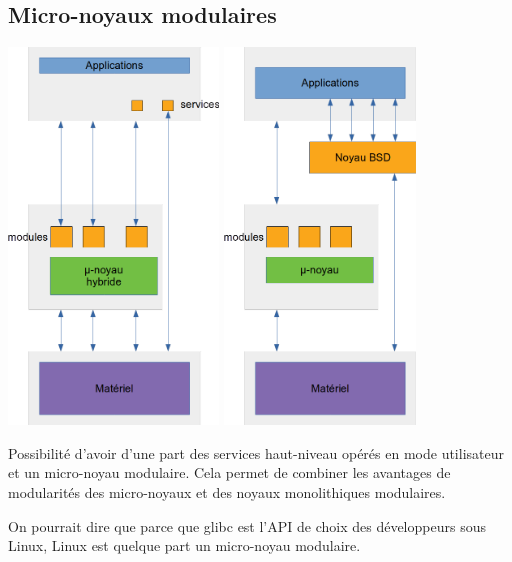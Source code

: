 \documentclass[10pt]{article}
\begin{document}
\subsection{Micro-noyaux modulaires}
\begin{center}
  \includegraphics[height=10cm]{pics/cours1/cours1_micromod.png}
  \includegraphics[height=10cm]{pics/cours1/cours1_mach.png}
\end{center}
Possibilité d'avoir d'une part des services haut-niveau opérés en mode utilisateur
et un micro-noyau modulaire. Cela permet de combiner les avantages de modularités
des micro-noyaux et des noyaux monolithiques modulaires.

On pourrait dire que parce que glibc est l'API de choix des développeurs sous
Linux, Linux est quelque part un micro-noyau modulaire.
\end{document}
